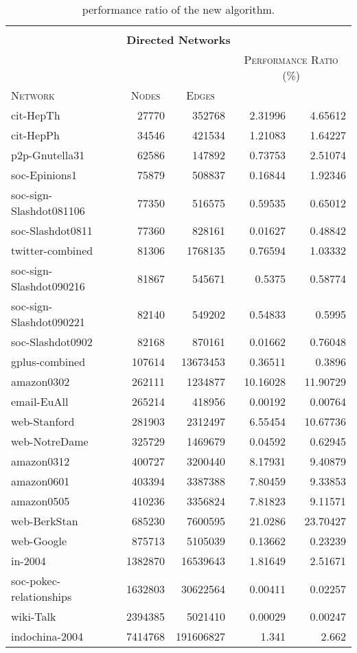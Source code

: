 \documentclass{acm_proc_article-sp}
\begin{document}
\begin{table*}[t]
\caption{performance ratio of the new algorithm.}
\label{tab:exp}
\centering
\begin{scriptsize}
\begin{tabular}{|l|r|r|r|r|}
\multicolumn{5}{c}{} \\
\multicolumn{5}{c}{\textbf{Directed Networks}} \\
\hline
 &  &  & \multicolumn{2}{c|}{\textsc{Performance Ratio (\%)}} \\
\textsc{Network} & \multicolumn{1}{c|}{\textsc{Nodes}} & \multicolumn{1}{c|}{\textsc{Edges}} & \multicolumn{1}{c|}{} & \multicolumn{1}{c|}{} \\
\hline
cit-HepTh & 27770 & 352768 & 2.31996 & 4.65612\\
cit-HepPh & 34546 & 421534 & 1.21083 & 1.64227\\
p2p-Gnutella31 & 62586 & 147892 & 0.73753 & 2.51074\\
soc-Epinions1 & 75879 & 508837 & 0.16844 & 1.92346\\
soc-sign-Slashdot081106 & 77350 & 516575 & 0.59535 & 0.65012\\
soc-Slashdot0811 & 77360 & 828161 & 0.01627 & 0.48842\\
twitter-combined & 81306 & 1768135 & 0.76594 & 1.03332\\
soc-sign-Slashdot090216 & 81867 & 545671 & 0.5375 & 0.58774\\
soc-sign-Slashdot090221 & 82140 & 549202 & 0.54833 & 0.5995\\
soc-Slashdot0902 & 82168 & 870161 & 0.01662 & 0.76048\\
gplus-combined & 107614 & 13673453 & 0.36511 & 0.3896\\
amazon0302 & 262111 & 1234877 & 10.16028 & 11.90729\\
email-EuAll & 265214 & 418956 & 0.00192 & 0.00764\\
web-Stanford & 281903 & 2312497 & 6.55454 & 10.67736\\
web-NotreDame & 325729 & 1469679 & 0.04592 & 0.62945\\
amazon0312 & 400727 & 3200440 & 8.17931 & 9.40879\\
amazon0601 & 403394 & 3387388 & 7.80459 & 9.33853\\
amazon0505 & 410236 & 3356824 & 7.81823 & 9.11571\\
web-BerkStan & 685230 & 7600595 & 21.0286 & 23.70427\\
web-Google & 875713 & 5105039 & 0.13662 & 0.23239\\
in-2004 & 1382870 & 16539643 & 1.81649 & 2.51671\\
soc-pokec-relationships & 1632803 & 30622564 & 0.00411 & 0.02257\\
wiki-Talk & 2394385 & 5021410 & 0.00029 & 0.00247\\
indochina-2004 & 7414768 & 191606827 & 1.341 & 2.662 \\
 \hline
 

\end{tabular}
\end{scriptsize}
\end{table*}
\end{document}
